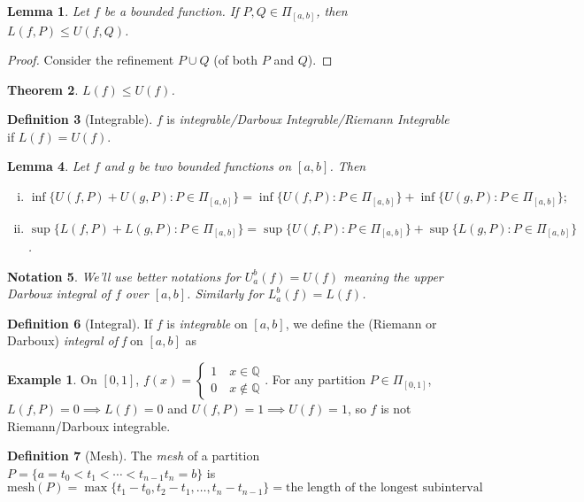 \documentclass[12pt, lettersize]{book}
\theoremstyle{plain}
\newtheorem{thm}{Theorem}[section]
\newtheorem{nte}[thm]{Notation}
\newtheorem{lem}[thm]{Lemma}
\theoremstyle{definition}
\newtheorem{dfn}[thm]{Definition}
\newtheorem*{eg}{Example}
\theoremstyle{remark}
\newcommand{\Q}{\mathbb{Q}}
\begin{document}
			\begin{lem}
			Let $f$ be a bounded function. If $P,Q\in\Pi_{[a,b]}$, then $L(f,P)\leq U(f,Q)$. 
			\end{lem}
			\begin{proof}
			Consider the refinement $P\cup Q$ (of both $P$ and $Q$).
			\end{proof}
			
			\begin{thm}
			$L(f)\leq U(f)$. 
			\end{thm}
			
			\begin{dfn}[Integrable]
			$f$ is \emph{integrable/Darboux Integrable/Riemann Integrable} if $L(f)=U(f)$. 
			\end{dfn}
			
			\begin{lem}
			Let $f$ and $g$ be two bounded functions on $[a,b]$. Then
			\begin{enumerate}[(i)]
				\item $\inf\{U(f,P)+U(g,P): P\in\Pi_{[a,b]}\} = \inf\{U(f,P): P\in\Pi_{[a,b]}\}+\inf\{U(g,P): P\in\Pi_{[a,b]}\};$   
				\item $\sup\{L(f,P)+L(g,P): P\in\Pi_{[a,b]}\} = \sup\{U(f,P): P\in\Pi_{[a,b]}\}+\sup\{L(g,P): P\in\Pi_{[a,b]}\}$.
			\end{enumerate}
			\end{lem}
			
			\begin{nte}
			We'll use better notations for $U_a^b(f)=U(f)$ meaning the upper Darboux integral of $f$ over $[a,b]$. Similarly for $L_a^b(f)=L(f)$. 
			\end{nte}
			
			\begin{dfn}[Integral]
			If $f$ is \emph{integrable} on $[a,b]$, we define the (Riemann or Darboux) \emph{integral of f} on $[a,b]$ as 
			\end{dfn}
			\begin{eg}
			On $[0,1]$, $f(x)=\begin{cases}1\quad\text{$x\in\Q$}\\0\quad\text{$x\notin\Q$}\end{cases}$. For any partition $P\in\Pi_{[0,1]}$, $L(f,P)=0\implies L(f)=0$ and $U(f,P)=1\implies U(f)=1$, so $f$ is not Riemann/Darboux integrable. 
			\end{eg}
			
			\begin{dfn}[Mesh]
			The \emph{mesh} of a partition $P=\{a=t_0<t_1<\cdots<t_{n-1}t_n=b\}$ is
			\begin{displaymath}
				\text{mesh}(P)=\max\{t_1-t_0,t_2-t_1,\dots,t_n-t_{n-1}\}=\text{the length of the longest subinterval}
			\end{displaymath}
			\end{dfn}
			
\end{document}
